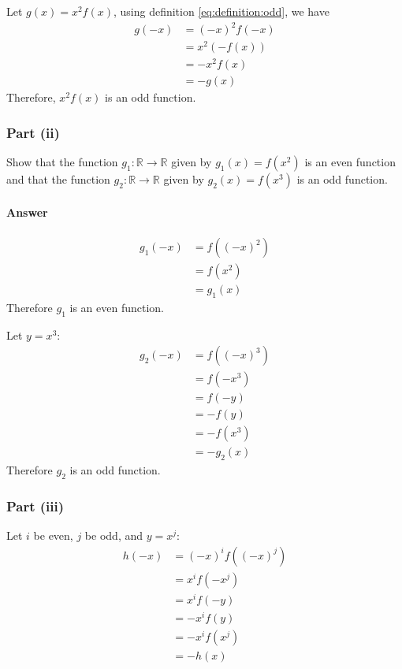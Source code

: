 Let $ g(x) = x^2 f(x) $, using definition \eqref{eq:definition:odd}, we have
\begin{align*}
    g(-x) &= (-x)^2 f(-x) \\
          &= x^2 (-f(x)) \\
          &= -x^2 f(x) \\
          &= -g(x)
\end{align*}
Therefore, $ x^2 f(x) $ is an odd function.

\subsubsection{Part (ii)}
Show that the function $ g_1 : \mathbb{R} \rightarrow \mathbb{R} $ given by
    $ g_1(x) = f(x^2) $ is an even function and that the function
    $ g_2 : \mathbb{R} \rightarrow \mathbb{R} $ given by $ g_2(x) = f(x^3) $ is
    an odd function.

\paragraph{Answer}
\begin{align*}
    g_1(-x) &= f((-x)^2) \\
            &= f(x^2) \\
            &= g_1(x)
\end{align*}
Therefore $ g_1 $ is an even function.

Let $ y = x^3 $:
\begin{align*}
    g_2(-x) &= f((-x)^3) \\
            &= f(-x^3) \\
            &= f(-y) \\
            &= -f(y) \\
            &= -f(x^3) \\
            &= -g_2(x)
\end{align*}
Therefore $ g_2 $ is an odd function.

\subsubsection{Part (iii)}
Let $ i $ be even, $ j $ be odd, and $ y = x^j $:
\begin{align*}
    h(-x) &= (-x)^i f((-x)^j) \\
          &= x^i f(-x^j) \\
          &= x^i f(-y) \\
          &= -x^i f(y) \\
          &= -x^i f(x^j) \\
          &= -h(x)
\end{align*}

